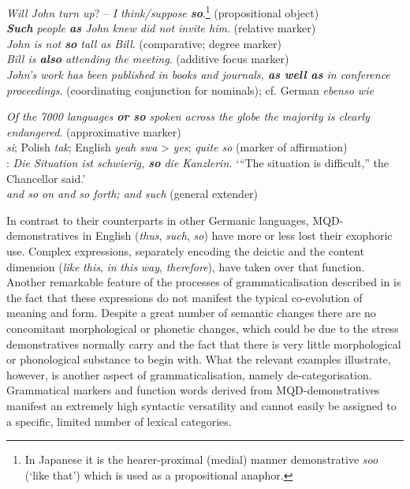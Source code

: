\documentclass[output=paper,colorlinks,citecolor=brown]{langscibook}
\begin{document}
\ea\label{ex:koenig:3}
\ea \textit{Will John turn up}? – \textit{I think/suppose \textbf{so}}.\footnote{In Japanese it is the hearer-proximal (medial) manner demonstrative \textit{soo} (‘like that’) which is used as a propositional anaphor.} (propositional object)\\

\ex \textit{\textbf{Such} people \textbf{as} John knew did not invite him}. (relative marker)\\

\ex \textit{John is not \textbf{so} tall as Bill}. (comparative; degree marker)\\

\ex \textit{Bill is \textbf{also} attending the meeting}. (additive focus marker)\\

\ex \textit{John’s work has been published in books and journals, \textbf{as well as} in conference proceedings}. (coordinating conjunction for nominals); cf. German \textit{ebenso wie}

\ex \textit{Of the 7000 languages \textbf{or so} spoken across the globe the majority is clearly endangered}. (approximative marker)\\

 \textit{si}; Polish \textit{tak}; English \textit{yeah swa} > \textit{yes}; \textit{quite so} (marker of affirmation)\\

: \textit{Die Situation ist schwierig, \textbf{so} die Kanzlerin.} ‘“The situation is difficult,” the Chancellor said.’\\ 

\ex \textit{and so on and so forth; and such} (general extender)\\
\z
\z

In contrast to their counterparts in other Germanic languages, MQD-demonstratives in English (\textit{thus}, \textit{such}, \textit{so}) have more or less lost their exophoric use. Complex expressions, separately encoding the deictic and the content dimension (\textit{like} \textit{this}, \textit{in} \textit{this} \textit{way}, \textit{therefore}), have taken over that function. Another remarkable feature of the processes of grammaticalisation described in  is the fact that these expressions do not manifest the typical co-evolution of meaning and form. Despite a great number of semantic changes there are no concomitant morphological or phonetic changes, which could be due to the stress demonstratives normally carry and the fact that there is very little morphological or phonological substance to begin with. What the relevant examples illustrate, however, is another aspect of grammaticalisation, namely de-categorisation. Grammatical markers and function words derived from MQD-demonstratives manifest an extremely high syntactic versatility and cannot easily be assigned to a specific, limited number of lexical categories.
\end{document}
